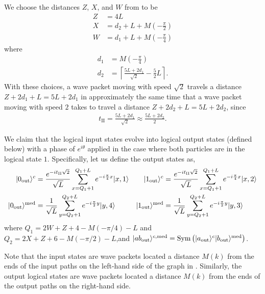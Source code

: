 \documentclass[../thesis-main/thesis-main]{subfiles}
\begin{document}
We choose the distances $Z$, $X$, and $W$ from 
to be \begin{align}
Z & = 4L \label{eq:Z_eq} \\
X & = d_{2}+L+M\left(-\frac{\pi}{2}\right) \label{eq:X_eq}\\
W & = d_{1}+L+M\left(-\frac{\pi}{4}\right) \label{eq:W_eq}
\end{align}
where
\begin{align*}
d_{1} & = M\left(-\frac{\pi}{4}\right) \\
d_{2} & = \left\lceil \frac{5L+2d_{1}}{\sqrt{2}}-\frac{5}{2}L\right\rceil. \end{align*}
With these choices, a wave packet moving with speed $\sqrt{2}$ travels
a distance $Z+2d_{1}+L=5L+2d_{1}$ in approximately the same time that
a wave packet moving with speed $2$ takes to travel a distance $Z+2d_{2}+L=5L+2d_{2}$,
since
\begin{align}
t_{\mathrm{II}}=\frac{5L+2d_{1}}{\sqrt{2}}\approx\frac{5L+2d_{2}}{2}.
\end{align}

We claim that the logical input states evolve into logical output states (defined below) with a phase of $e^{i\theta}$ applied in the case where both particles are in the logical state $1$.  Specifically, let us define the output states as, 
\begin{align*}
|0_\text{out}\rangle^c &=\frac{e^{-it_{\mathrm{II}}\sqrt{2}}}{\sqrt{L}}\sum_{x=Q_{1}+1}^{Q_{1}+L}e^{-i\frac{\pi}{4}x}|x,1\rangle &
|1_\text{out}\rangle^c &=\frac{e^{-it_{\mathrm{II}}\sqrt{2}}}{\sqrt{L}}\sum_{x=Q_{1}+1}^{Q_{1}+L}e^{-i\frac{\pi}{4}x}|x,2\rangle \\
|0_\text{out}\rangle^{\text{med}} &=\frac{1}{\sqrt{L}}\sum_{y=Q_{2}+1}^{Q_{2}+L}e^{-i\frac{\pi}{2}y}|y,4\rangle &|1_\text{out}\rangle^{\text{med}} &=\frac{1}{\sqrt{L}}\sum_{y=Q_{2}+1}^{Q_{2}+L}e^{-i\frac{\pi}{2}y}|y,3\rangle
\end{align*}
where  $Q_{1}=2W+Z+4-M\left(-{\pi}/{4}\right)-L$ and $Q_{2}=2X+Z+6-M\left(-{\pi}/{2}\right)-L$,and $|a b_\text{out}\rangle^{c,\text{med}}=\text{Sym}\left(|a_{\text{out}}\rangle^c|b_{\text{out}}\rangle^{\text{med}}\right)$. 

Note that the input states are wave packets located a distance $M(k)$ from the ends of the input paths on the left-hand side of the graph in . Similarly, the output logical states are wave packets located a distance $M(k)$ from the ends of the output paths on the right-hand side.
\end{document}
